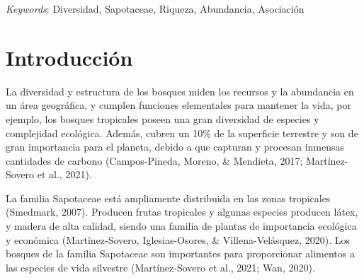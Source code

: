 \documentclass[11pt,]{article}
\renewenvironment{abstract}
 {{%
    \setlength{\leftmargin}{0mm}
    \setlength{\rightmargin}{\leftmargin}%
  }%
  \relax}
 {\endlist}
\begin{document}
\begin{abstract}
\vskip 8.5pt \noindent \emph{Keywords}: Diversidad, Sapotaceae, Riqueza, Abundancia, Asociación \par

    \hbox{\vrule height .2pt width 39.14pc}



\end{abstract}


\vskip 6.5pt


\noindent  \section{Introducción}\label{introducciuxf3n}

La diversidad y estructura de los bosques miden los recursos y la
abundancia en un área geográfica, y cumplen funciones elementales para
mantener la vida, por ejemplo, los bosques tropicales poseen una gran
diversidad de especies y complejidad ecológica. Además, cubren un 10\%
de la superficie terrestre y son de gran importancia para el planeta,
debido a que capturan y procesan inmensas cantidades de carbono
(Campos-Pineda, Moreno, \& Mendieta, 2017; Martínez-Sovero et al.,
2021).

La familia Sapotaceae está ampliamente distribuida en las zonas
tropicales (Smedmark, 2007). Producen frutas tropicales y algunas
especies producen látex, y madera de alta calidad, siendo una familia de
plantas de importancia ecológica y económica (Martínez-Sovero,
Iglesias-Osores, \& Villena-Velásquez, 2020). Los bosques de la familia
Sapotaceae son importantes para proporcionar alimentos a las especies de
vida silvestre (Martínez-Sovero et al., 2021; Wan, 2020).
\end{document}
